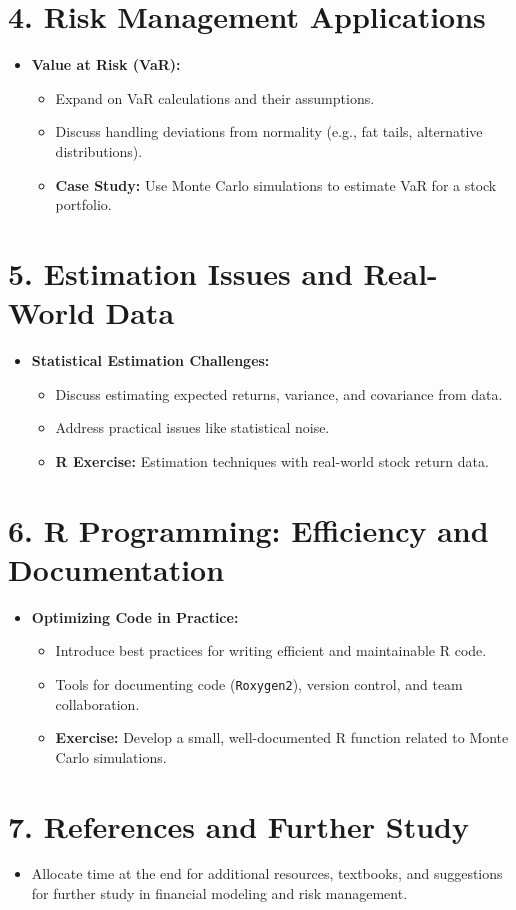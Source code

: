 \documentclass[12pt]{article}
\begin{document}
	\section*{4. Risk Management Applications}
	\begin{itemize}
		\item \textbf{Value at Risk (VaR):}
		\begin{itemize}
			\item Expand on VaR calculations and their assumptions.
			\item Discuss handling deviations from normality (e.g., fat tails, alternative distributions).
			\item \textbf{Case Study:} Use Monte Carlo simulations to estimate VaR for a stock portfolio.
		\end{itemize}
	\end{itemize}
	
	\section*{5. Estimation Issues and Real-World Data}
	\begin{itemize}
		\item \textbf{Statistical Estimation Challenges:}
		\begin{itemize}
			\item Discuss estimating expected returns, variance, and covariance from data.
			\item Address practical issues like statistical noise.
			\item \textbf{R Exercise:} Estimation techniques with real-world stock return data.
		\end{itemize}
	\end{itemize}
	
	\section*{6. R Programming: Efficiency and Documentation}
	\begin{itemize}
		\item \textbf{Optimizing Code in Practice:}
		\begin{itemize}
			\item Introduce best practices for writing efficient and maintainable R code.
			\item Tools for documenting code (\texttt{Roxygen2}), version control, and team collaboration.
			\item \textbf{Exercise:} Develop a small, well-documented R function related to Monte Carlo simulations.
		\end{itemize}
	\end{itemize}
	
	\section*{7. References and Further Study}
	\begin{itemize}
		\item Allocate time at the end for additional resources, textbooks, and suggestions for further study in financial modeling and risk management.
	\end{itemize}
	
\end{document}
